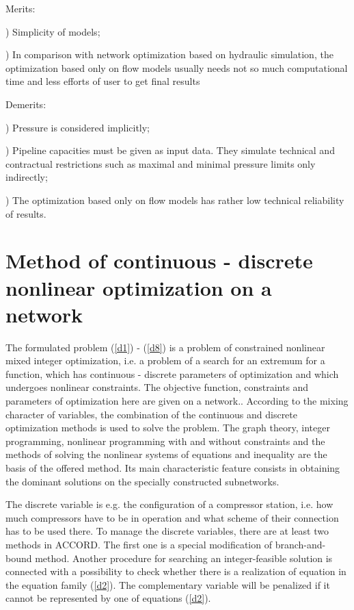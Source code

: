 \documentclass{article}
\begin{document}
Merits:

) Simplicity of models;

) In comparison with network optimization based on hydraulic
simulation, the optimization based only on flow models usually needs not so
much computational time and less efforts of user to get final results

Demerits:

) Pressure is considered implicitly;

) Pipeline capacities must be given as input data. They simulate
technical and contractual restrictions such as maximal and minimal pressure
limits only indirectly;

) The optimization based only on flow models has rather low
technical reliability of results.

\section{Method of continuous - discrete nonlinear optimization on a network}

The formulated problem (\ref{d1}) - (\ref{d8}) is a problem of constrained
nonlinear mixed integer optimization, i.e. a problem of a search for an
extremum for a function, which has continuous - discrete parameters of
optimization and which undergoes nonlinear constraints. The objective
function, constraints and parameters of optimization here are given on a
network.. According to the mixing character of variables, the combination of
the continuous and discrete optimization methods is used to solve the
problem. The graph theory, integer programming, nonlinear programming with
and without constraints and the methods of solving the nonlinear systems of
equations and inequality are the basis of the offered method. Its main
characteristic feature consists in obtaining the dominant solutions on the
specially constructed subnetworks.

The discrete variable is e.g. the configuration of a compressor station,
i.e. how much compressors have to be in operation and what scheme of their
connection has to be used there. To manage the discrete variables, there are
at least two methods in ACCORD. The first one is a special modification of
branch-and-bound method. Another procedure for searching an integer-feasible
solution is connected with a possibility to check whether there is a
realization of equation  in the equation family (\ref{d2}). The complementary variable  will be penalized if it cannot be
represented by one of equations (\ref{d2}).
\end{document}
